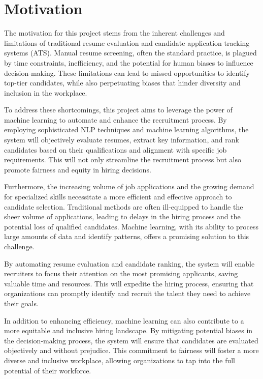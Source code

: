 \section{Motivation}
The motivation for this project stems from the inherent challenges and limitations of traditional resume evaluation and candidate application tracking systems (ATS). Manual resume screening, often the standard practice, is plagued by time constraints, inefficiency, and the potential for human biases to influence decision-making. These limitations can lead to missed opportunities to identify top-tier candidates, while also perpetuating biases that hinder diversity and inclusion in the workplace.

To address these shortcomings, this project aims to leverage the power of machine learning to automate and enhance the recruitment process. By employing sophisticated NLP techniques and machine learning algorithms, the system will objectively evaluate resumes, extract key information, and rank candidates based on their qualifications and alignment with specific job requirements. This will not only streamline the recruitment process but also promote fairness and equity in hiring decisions.

Furthermore, the increasing volume of job applications and the growing demand for specialized skills necessitate a more efficient and effective approach to candidate selection. Traditional methods are often ill-equipped to handle the sheer volume of applications, leading to delays in the hiring process and the potential loss of qualified candidates. Machine learning, with its ability to process large amounts of data and identify patterns, offers a promising solution to this challenge.

By automating resume evaluation and candidate ranking, the system will enable recruiters to focus their attention on the most promising applicants, saving valuable time and resources. This will expedite the hiring process, ensuring that organizations can promptly identify and recruit the talent they need to achieve their goals.

In addition to enhancing efficiency, machine learning can also contribute to a more equitable and inclusive hiring landscape. By mitigating potential biases in the decision-making process, the system will ensure that candidates are evaluated objectively and without prejudice. This commitment to fairness will foster a more diverse and inclusive workplace, allowing organizations to tap into the full potential of their workforce.

